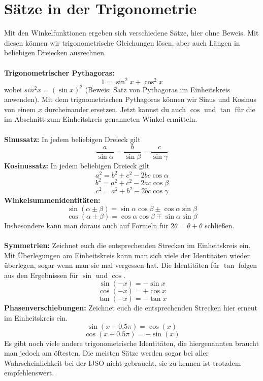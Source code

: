 \documentclass[11pt]{article}
\begin{document}
\section{Sätze in der Trigonometrie}
Mit den Winkelfunktionen ergeben sich verschiedene Sätze, hier ohne Beweis. Mit diesen können wir trigonometrische Gleichungen lösen, aber auch Längen in beliebigen Dreiecken ausrechnen. \\\\
\textbf{Trigonometrischer Pythagoras:} $$1 = \sin^2 x + \cos^2 x$$ wobei $sin^2x = (\sin x)^2$ (Beweis: Satz von Pythagoras im Einheitskreis anwenden). Mit dem trignometrischen Pythagoras können wir Sinus und Kosinus von einem $x$ durcheinander ersetzen. Jetzt kannst du auch $\cos$ und $\tan$ für die im Abschnitt zum Einheitskreis genanneten Winkel ermitteln. \\\\
\textbf{Sinussatz:} In jedem beliebigen Dreieck gilt 
$$\frac{a}{\sin\alpha} = \frac{b}{\sin\beta} = \frac{c}{\sin\gamma}$$ 
\textbf{Kosinussatz:} In jedem beliebigen Dreieck gilt 
$$a^2 = b^2 + c^2 - 2bc \cos \alpha$$ 
$$b^2 = a^2 + c^2 - 2ac \cos \beta$$ 
$$c^2 = a^2 + b^2 - 2bc \cos \gamma$$ 
\textbf{Winkelsummenidentitäten:}
$$\sin{(\alpha \pm \beta)} = \sin\alpha\cos\beta \pm \cos\alpha\sin\beta$$
$$\cos{(\alpha \pm \beta)} = \cos\alpha\cos\beta \mp \sin\alpha\sin\beta$$
Insbesondere kann man daraus auch auf Formeln für $2\theta = \theta + \theta$ schließen. \\\\
\textbf{Symmetrien:} Zeichnet euch die entsprechenden Strecken im Einheitskreis ein. Mit Überlegungen am Einheitskreis kann man sich viele der Identitäten wieder überlegen, sogar wenn man sie mal vergessen hat. Die Identitäten für $\tan$ folgen aus den Ergebnissen für $\sin$ und $\cos$. 
$$\sin(-x) = -\sin x$$
$$\cos(-x) = +\cos x$$
$$\tan(-x) = -\tan x$$
\textbf{Phasenverschiebungen:} Zeichnet euch die entsprechenden Strecken hier erneut im Einheitskreis ein.
$$\sin(x+0.5\pi) = \cos(x)$$ 
$$\cos(x+0.5\pi) = -\sin(x)$$
Es gibt noch viele andere trigonometrische Identitäten, die hiergenannten braucht man jedoch am öftesten. Die meisten Sätze werden sogar bei aller Wahrscheinlichkeit bei der IJSO nicht gebraucht, sie zu kennen ist trotzdem empfehlenswert. 
\end{document}
